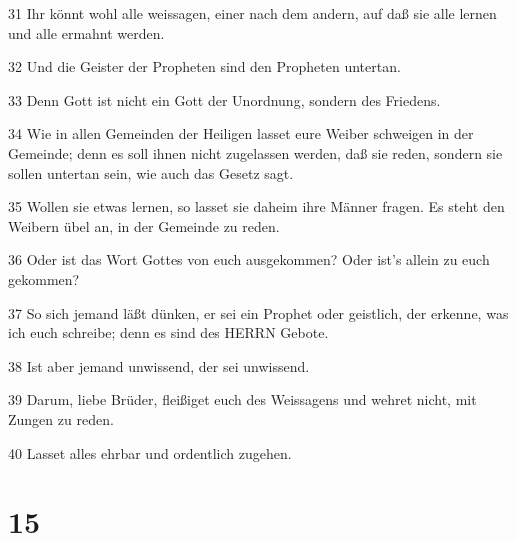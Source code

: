 \par 31 Ihr könnt wohl alle weissagen, einer nach dem andern, auf daß sie alle lernen und alle ermahnt werden.
\par 32 Und die Geister der Propheten sind den Propheten untertan.
\par 33 Denn Gott ist nicht ein Gott der Unordnung, sondern des Friedens.
\par 34 Wie in allen Gemeinden der Heiligen lasset eure Weiber schweigen in der Gemeinde; denn es soll ihnen nicht zugelassen werden, daß sie reden, sondern sie sollen untertan sein, wie auch das Gesetz sagt.
\par 35 Wollen sie etwas lernen, so lasset sie daheim ihre Männer fragen. Es steht den Weibern übel an, in der Gemeinde zu reden.
\par 36 Oder ist das Wort Gottes von euch ausgekommen? Oder ist's allein zu euch gekommen?
\par 37 So sich jemand läßt dünken, er sei ein Prophet oder geistlich, der erkenne, was ich euch schreibe; denn es sind des HERRN Gebote.
\par 38 Ist aber jemand unwissend, der sei unwissend.
\par 39 Darum, liebe Brüder, fleißiget euch des Weissagens und wehret nicht, mit Zungen zu reden.
\par 40 Lasset alles ehrbar und ordentlich zugehen.

\chapter{15}

